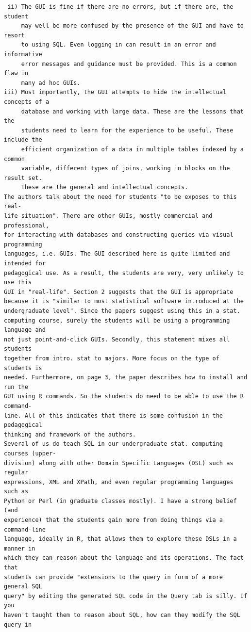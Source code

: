\documentclass[11pt]{tise_style}
\begin{document}
\begin{verbatim}
 ii) The GUI is fine if there are no errors, but if there are, the student
     may well be more confused by the presence of the GUI and have to resort
     to using SQL. Even logging in can result in an error and informative
     error messages and guidance must be provided. This is a common flaw in
     many ad hoc GUIs.
iii) Most importantly, the GUI attempts to hide the intellectual concepts of a
     database and working with large data. These are the lessons that the
     students need to learn for the experience to be useful. These include the
     efficient organization of a data in multiple tables indexed by a common
     variable, different types of joins, working in blocks on the result set.
     These are the general and intellectual concepts.
The authors talk about the need for students "to be exposes to this real-
life situation". There are other GUIs, mostly commercial and professional,
for interacting with databases and constructing queries via visual programming
languages, i.e. GUIs. The GUI described here is quite limited and intended for
pedagogical use. As a result, the students are very, very unlikely to use this
GUI in "real-life". Section 2 suggests that the GUI is appropriate
because it is "similar to most statistical software introduced at the
undergraduate level". Since the papers suggest using this in a stat.
computing course, surely the students will be using a programming language and
not just point-and-click GUIs. Secondly, this statement mixes all students
together from intro. stat to majors. More focus on the type of students is
needed. Furthermore, on page 3, the paper describes how to install and run the
GUI using R commands. So the students do need to be able to use the R command-
line. All of this indicates that there is some confusion in the pedagogical
thinking and framework of the authors.
Several of us do teach SQL in our undergraduate stat. computing courses (upper-
division) along with other Domain Specific Languages (DSL) such as regular
expressions, XML and XPath, and even regular programming languages such as
Python or Perl (in graduate classes mostly). I have a strong belief (and
experience) that the students gain more from doing things via a command-line
language, ideally in R, that allows them to explore these DSLs in a manner in
which they can reason about the language and its operations. The fact that
students can provide "extensions to the query in form of a more general SQL
query" by editing the generated SQL code in the Query tab is silly. If you
haven't taught them to reason about SQL, how can they modify the SQL query in

\end{verbatim}
\end{document}
